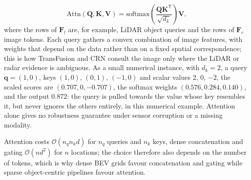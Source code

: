 \begin{list4a}
\begin{equation}
    \mathrm{Attn}(\mathbf{Q},\mathbf{K},\mathbf{V})=\mathrm{softmax}\!\left(\frac{\mathbf{Q}\mathbf{K}^{\mathsf T}}{\sqrt{d_k}}\right)\mathbf{V},
    \label{eq:cross-attention}
    \end{equation}
    where the rows of $\mathbf{F}_l$ are, for example, LiDAR object queries and the rows of $\mathbf{F}_c$ image tokens. Each query gathers a convex combination of image features, with weights that depend on the data rather than on a fixed spatial correspondence; this is how TransFusion \cite{bai2022_transfusion} and CRN \cite{kim2023_crn} consult the image only where the LiDAR or radar evidence is ambiguous. As a small numerical instance, with $d_k=2$, a query $\mathbf{q}=(1,0)$, keys $(1,0)$, $(0,1)$, $(-1,0)$ and scalar values $2$, $0$, $-2$, the scaled scores are $(0.707,0,-0.707)$, the softmax weights $(0.576,0.284,0.140)$, and the output $0.872$: the query is pulled towards the value whose key resembles it, but never ignores the others entirely, in this numerical example. Attention alone gives no robustness guarantee under sensor corruption or a missing modality.
\end{list4a}
Attention costs $\mathcal{O}(n_q n_k d)$ for $n_q$ queries and $n_k$ keys, dense concatenation and gating $\mathcal{O}(n d^{2})$ for $n$ locations; the choice therefore also depends on the number of tokens, which is why dense BEV grids favour concatenation and gating while sparse object-centric pipelines favour attention.

